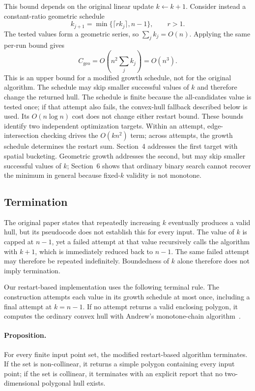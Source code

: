 \documentclass[a4paper,twoside]{article}
\begin{document}
This bound depends on the original linear update $k\leftarrow k+1$. Consider
instead a constant-ratio geometric schedule
\[
k_{j+1}=\min\{\lceil r k_j\rceil,n-1\},\qquad r>1.
\]
The tested values form a geometric series, so $\sum_j k_j=O(n)$. Applying the
same per-run bound gives
\[
C_{\mathrm{geo}}
=O\!\left(n^2\sum_j k_j\right)
=\boxed{O(n^3)}.
\]
This is an upper bound for a modified growth schedule, not for the original
algorithm. The schedule may skip smaller successful values of $k$ and therefore
change the returned hull. The schedule is finite because the all-candidates
value is tested once; if that attempt also fails, the convex-hull fallback
described below is used. Its $O(n\log n)$ cost does not change either restart
bound.
These bounds identify two independent optimization targets. Within an attempt,
edge-intersection checking drives the $O(kn^2)$ term; across attempts, the growth
schedule determines the restart sum. Section~4 addresses the first target with
spatial bucketing. Geometric growth addresses the second, but may skip smaller
successful values of $k$; Section~6 shows that ordinary binary search cannot
recover the minimum in general because fixed-$k$ validity is not monotone.


\subsection{Termination}

The original paper states that repeatedly increasing \(k\) eventually produces a valid hull, but its pseudocode does not establish this for every input. The value of \(k\) is capped at \(n-1\), yet a failed attempt at that value recursively calls the algorithm with \(k+1\), which is immediately reduced back to \(n-1\). The same failed attempt may therefore be repeated indefinitely. Boundedness of \(k\) alone therefore does not imply termination.

Our restart-based implementation uses the following terminal rule. The construction attempts each value in its growth schedule at most once, including a final attempt at \(k=n-1\). If no attempt returns a valid enclosing polygon, it computes the ordinary convex hull with Andrew's monotone-chain algorithm~\cite{andrew1979}.

\paragraph{Proposition.}
For every finite input point set, the modified restart-based algorithm terminates. If the set is non-collinear, it returns a simple polygon containing every input point; if the set is collinear, it terminates with an explicit report that no two-dimensional polygonal hull exists.
\end{document}
